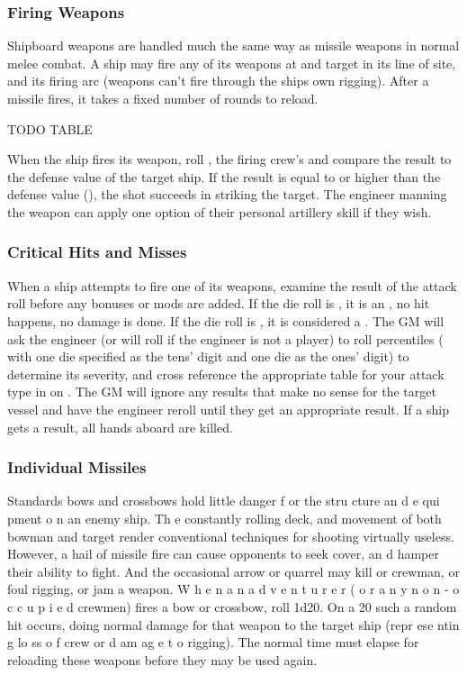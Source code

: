 \begin{multicols*}{2}
\subsubsection{Firing Weapons}
Shipboard weapons are handled much the same way as missile weapons in normal melee combat. A ship may fire any of its weapons at and target in its line of site, and its
firing arc (weapons can't fire through the ships own rigging). After a missile fires, it takes a fixed number of rounds to reload. 

TODO TABLE 

When the ship fires its weapon, roll ,  the firing crew's  and compare the result to the defense value of the target ship. If the result is equal to or higher than the defense value (\ADV), the shot succeeds in striking the target. The engineer manning the weapon can apply one option of their personal artillery skill if they wish.


\subsubsection{Critical Hits and Misses}
When a ship attempts to fire one of its weapons, examine the result of the attack roll before any bonuses or mods are added. If the die roll is , it is an , no hit happens, no damage is done. If the die roll is , it is considered a . The GM will ask the engineer (or will roll if the engineer is not a player) to roll percentiles ( with one die specified as the tens' digit and one die as the ones' digit) to determine its severity, and cross reference the appropriate table for your attack type in  on . The GM  will ignore any results that make no sense for the target vessel and have the engineer reroll until they get an appropriate result. If a ship gets a  result, all hands aboard are killed.
\subsubsection{Individual Missiles}
Standards bows and crossbows hold little danger
f or the stru cture an d e qui pment o n an enemy ship. Th e
constantly rolling deck, and movement of both bowman and
target render conventional techniques for shooting virtually
useless. However, a hail of missile fire can cause opponents
to seek cover, an d hamper their ability to fight. And the
occasional arrow or quarrel may kill or crewman, or foul
rigging, or jam a weapon.
W h e n a n a d v e n t u r e r ( o r a n y n o n - o c c u p i e d
crewmen) fires a bow or crossbow, roll 1d20. On a 20 such a
random hit occurs, doing normal damage for that weapon to
the target ship (repr ese ntin g lo ss o f crew or d am ag e t o
rigging). The normal time must elapse for reloading these
weapons before they may be used again.

\end{multicols*}
